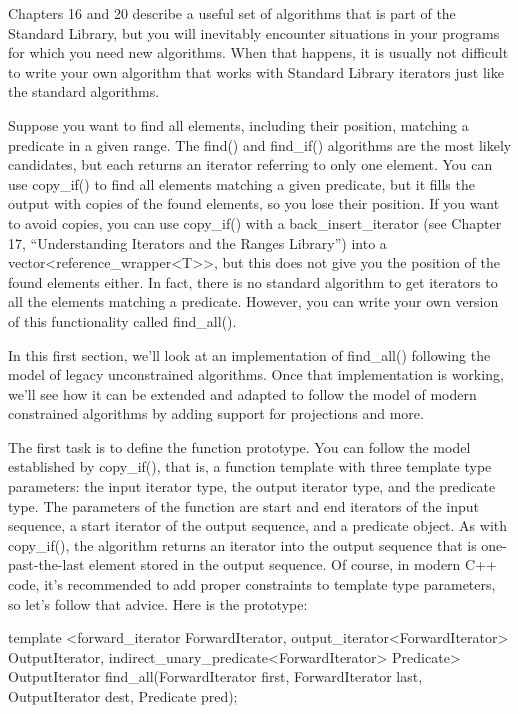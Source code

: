 Chapters 16 and 20 describe a useful set of algorithms that is part of the Standard Library, but you will inevitably encounter situations in your programs for which you need new algorithms. When that happens, it is usually not difficult to write your own algorithm that works with Standard Library iterators just like the standard algorithms.


Suppose you want to find all elements, including their position, matching a predicate in a given range.
The find() and find\_if() algorithms are the most likely candidates, but each returns an iterator referring to only one element. You can use copy\_if() to find all elements matching a given predicate, but it fills the output with copies of the found elements, so you lose their position. If you want to avoid copies, you can use copy\_if() with a back\_insert\_iterator (see Chapter 17, “Understanding Iterators and the Ranges Library”) into a vector<reference\_wrapper<T>>, but this does not give you the position of the found elements either. In fact, there is no standard algorithm to get iterators to all the elements matching a predicate. However, you can write your own version of this functionality called find\_all().

In this first section, we’ll look at an implementation of find\_all() following the model of legacy unconstrained algorithms. Once that implementation is working, we’ll see how it can be extended and adapted to follow the model of modern constrained algorithms by adding support for projections and more.

The first task is to define the function prototype. You can follow the model established by copy\_if(), that is, a function template with three template type parameters: the input iterator type, the output iterator type, and the predicate type. The parameters of the function are start and end iterators of the input sequence, a start iterator of the output sequence, and a predicate object. As with copy\_if(), the algorithm returns an iterator into the output sequence that is one-past-the-last element stored in the output sequence. Of course, in modern C++ code, it’s recommended to add proper constraints to template type parameters, so let’s follow that advice. Here is the prototype:

\begin{cpp}
template <forward_iterator ForwardIterator,
          output_iterator<ForwardIterator> OutputIterator,
          indirect_unary_predicate<ForwardIterator> Predicate>
OutputIterator find_all(ForwardIterator first, ForwardIterator last,
                        OutputIterator dest, Predicate pred);
\end{cpp}

